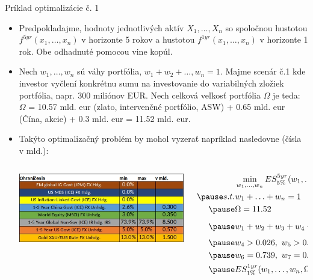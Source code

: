 \documentclass{Bredelebeamer}
\begin{document}
\begin{frame}{Príklad optimalizácie č. 1}
	\begin{itemize}
		\item Predpokladajme, hodnoty jednotlivých aktív $X_1, \ldots, X_n$ so spoločnou hustotou $f^{5yr}(x_1, \ldots, x_n)$ v horizonte 5 rokov a hustotou $f^{1yr}(x_1, \ldots, x_n)$ v horizonte 1 rok. Obe odhadnuté pomocou vine kopúl.
		\pause\item Nech $w_1, \ldots, w_n$ sú váhy portfólia, $w_1 + w_2 + \ldots, w_n = 1$. Majme scenár č.1 kde investor vyčlení konkrétnu sumu na investovanie do variabilných zložiek portfólia, napr. 300 miliónov EUR. Nech celková veľkosť portfólia $\Omega$ je teda:\\
		
		$\Omega$ = 10.57 mld. eur (zlato, intervenčné portfólio, ASW) + 0.65 mld. eur (Čína, akcie) + 0.3 mld. eur = 11.52 mld. eur.
		\pause\item Takýto optimalizačný problém by mohol vyzerať napríklad nasledovne (čísla v mld.):
		\begin{columns}
			\begin{column}{0.48\textwidth}
				\centering
				\includegraphics[width=1.1\textwidth]{Figures/constraints}
			\end{column}
			\pause\begin{column}{0.48\textwidth}
				\[
				\begin{aligned}
					&\min_{w_1, \ldots, w_n}ES_{5\%}^{5yr}(w_1, \ldots, w_n, \Omega) \\\pause
					s.t. &w_1 + \ldots + w_n = 1 \\\pause
					&\Omega = 11.52\\\pause
					&w_1 + w_2 + w_3 + w_4 + w_5 = \frac{0.65 + 0.3}{\Omega} \\\pause
					&w_4 > 0.026, \ w_5 > 0.03 \\\pause
					&w_6 = 0.739, \ w_7 = 0.05, \ w_8 = 0.13 \\\pause
					&ES_{1\%}^{1yr}(w_1, \ldots, w_n, \Omega) \leq 0.4
				\end{aligned}
				\]
			\end{column}
		\end{columns}
		
	\end{itemize}
\end{frame}
\end{document}
